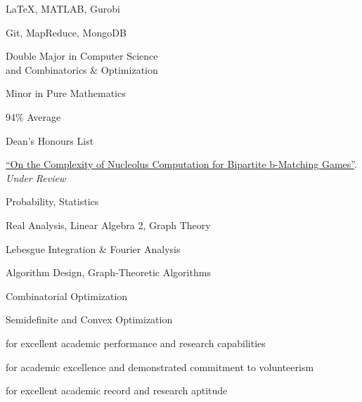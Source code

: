 \documentclass[10pt,a4paper,ragged2e]{altacv}
\begin{document}
\begin{paracol}{2}
\smallskip

\LaTeX, MATLAB, Gurobi

\divider\smallskip

Git, MapReduce, MongoDB

Double Major in Computer Science\\
and Combinatorics \& Optimization

\smallskip

Minor in Pure Mathematics

\smallskip

94\% Average

\smallskip

Dean's Honours List

\href{https://arxiv.org/abs/2105.07161}{``On the Complexity of Nucleolus Computation for Bipartite b-Matching Games''}.
\emph{Under Review}

Probability, Statistics

\smallskip

Real Analysis, Linear Algebra 2, Graph Theory

\smallskip

Lebesgue Integration \& Fourier Analysis

\divider\smallskip

Algorithm Design, Graph-Theoretic Algorithms


\smallskip

Combinatorial Optimization

\smallskip

Semidefinite and Convex Optimization


for excellent academic performance and research capabilities

\divider\smallskip

for academic excellence and demonstrated commitment to volunteerism

\divider\smallskip

for excellent academic record and research aptitude

\divider\smallskip


\iffalse
\divider\smallskip

\cvevent{President's Scholarship of Distinction}{University of Waterloo}{September 2017}{}
for entrance average above 95\%
\fi

\end{paracol}
\end{document}
